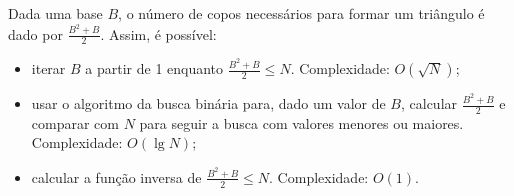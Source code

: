 Dada uma base $B$, o número de copos necessários para formar um triângulo é dado
por $\frac{B^2 + B}{2}$. Assim, é possível:

\begin{itemize}
    \item iterar $B$ a partir de 1 enquanto $\frac{B^2 + B}{2} \leq N$.
    Complexidade: $O(\sqrt{N})$;
    \item usar o algoritmo da busca binária para, dado um valor de $B$, calcular
    $\frac{B^2 + B}{2}$ e comparar com $N$ para seguir a busca com valores
    menores ou maiores. Complexidade: $O(\lg N)$;
    \item calcular a função inversa de $\frac{B^2 + B}{2} \leq N$. Complexidade:
    $O(1)$.
\end{itemize}
